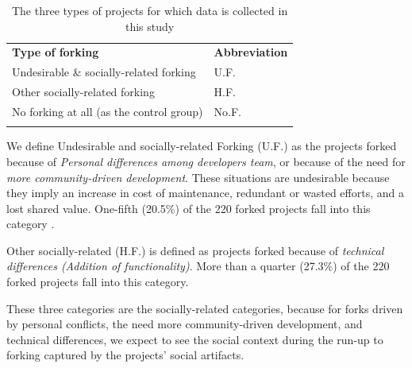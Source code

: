 \documentclass[11pt]{report}
\begin{document}
\begin{table} [H]
\caption[Undesirable forking vs. Other categories]{The three types of projects for which data is collected in this study}
\label{tableUndesirableForkingDataCollect} 
\begin{tabular}{p{} p{}}
\hline\noalign{\smallskip}
\textbf{Type of forking} & \textbf{Abbreviation} \\
\noalign{\smallskip}\hline\noalign{\smallskip}
Undesirable \& socially-related forking & U.F. \\ \hline
Other socially-related forking & H.F. \\\hline
No forking at all (as the control group) & No.F. \\
\noalign{\smallskip}\hline
\end{tabular}
\end{table}

We define Undesirable and socially-related Forking (U.F.) as the projects forked because of \textit{Personal differences among developers team}, or because of the need for \textit{more community-driven development}. These situations are undesirable because they imply an increase in cost of maintenance, redundant or wasted efforts, and a lost shared value. One-fifth (20.5\%) of the 220 forked projects fall into this category \cite{Robles}.

Other socially-related (H.F.) is defined as projects forked because of \textit{technical differences (Addition of functionality)}. More than a quarter (27.3\%) of the 220 forked projects fall into this category.

These three categories are the socially-related categories, because for forks driven by personal conflicts, the need more community-driven development, and technical differences, we expect to see the social context during the run-up to forking captured by the projects' social artifacts.
\end{document}
